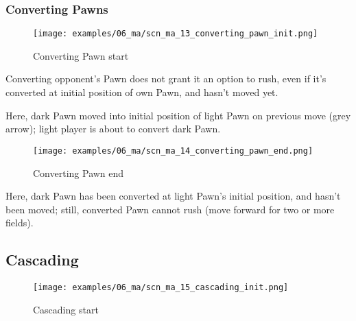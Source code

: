 \clearpage %

\subsubsection*{Converting Pawns}
\label{sec:Mayan Ascendancy/Pyramid/Conversion/Converting Pawns}

\vspace*{-1.1\baselineskip}
\noindent
\begin{figure}[!h]
\texttt{[image: examples/06\_ma/scn\_ma\_13\_converting\_pawn\_init.png]}
\caption{Converting Pawn start}
\label{fig:scn_ma_13_converting_pawn_init}
\end{figure}

Converting opponent's Pawn does not grant it an option to rush, even if it's
converted at initial position of own Pawn, and hasn't moved yet.

Here, dark Pawn moved into initial position of light Pawn on previous move
(grey arrow); light player is about to convert dark Pawn.

\clearpage %

\noindent
\begin{figure}[!h]
\texttt{[image: examples/06\_ma/scn\_ma\_14\_converting\_pawn\_end.png]}
\caption{Converting Pawn end}
\label{fig:scn_ma_14_converting_pawn_end}
\end{figure}

Here, dark Pawn has been converted at light Pawn's initial position, and hasn't
been moved; still, converted Pawn cannot rush (move forward for two or more fields).

\clearpage %

\subsection*{Cascading}

\noindent
\begin{figure}[!h]
\texttt{[image: examples/06\_ma/scn\_ma\_15\_cascading\_init.png]}
\caption{Cascading start}
\label{fig:scn_ma_15_cascading_init}
\end{figure}

